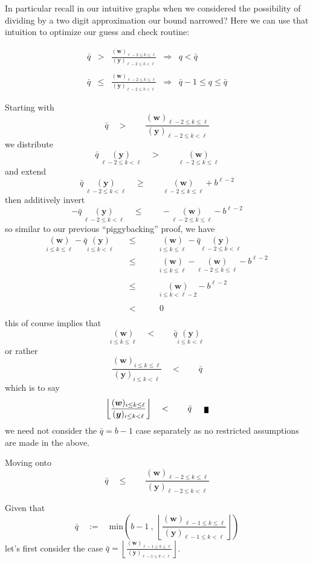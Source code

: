 \documentclass[twoside]{article}
\renewcommand{\leq}{\ensuremath{\quad\le\qquad}}
\renewcommand{\geq}{\ensuremath{\quad\ge\qquad}}
\newcommand{\bradix}[2][u]{\ensuremath{\underset{#2}{(\bm{#1})}}}
\newcommand{\numer}[3][w]{\ensuremath{(\bm{#1})_{#2\le k\le #3}}}
\newcommand{\denom}[3][y]{\ensuremath{(\bm{#1})_{#2\le k <  #3}}}
\newcommand{\qed}{\nobreak \ifvmode \relax \else
      \ifdim\lastskip<1.5em \hskip-\lastskip
      \hskip1.5em plus0em minus0.5em \fi \nobreak
      \vrule height0.5em width0.5em depth0.25em\fi}
\begin{document}
In particular recall in our intuitive graphs when we considered the possibility of dividing by a two digit approximation
our bound narrowed? Here we can use that intuition to optimize our guess and check routine:

$$ \boxed{
\begin{array}{lcccl}
\bar{q} & > & \frac{\numer{\ell-2}{\ell}}{\denom{\ell-2}{\ell}} & \Longrightarrow & q < \bar{q} \\
\\
\bar{q} & \le & \frac{\numer{\ell-2}{\ell}}{\denom{\ell-2}{\ell}} & \Longrightarrow & \bar{q}-1\le q\le\bar{q}
\end{array}
} $$

Starting with
$$ \bar{q}\quad >\qquad\frac{\numer{\ell-2}{\ell}}{\denom{\ell-2}{\ell}} $$
we distribute
$$ \bar{q}\ \bradix[y]{\ell-2\le k < \ell}\quad >\qquad\bradix[w]{\ell-2\le k\le\ell} $$
and extend
$$ \bar{q}\ \bradix[y]{\ell-2\le k < \ell}
	\geq\bradix[w]{\ell-2\le k\le\ell}+b^{\ell-2} $$
then additively invert
$$ -\bar{q}\ \bradix[y]{\ell-2\le k < \ell}
	\leq-\bradix[w]{\ell-2\le k\le\ell}-b^{\ell-2} $$
so similar to our previous ``piggybacking'' proof, we have
$$ \begin{array}{rcl}
\bradix[w]{i\le k\le\ell}-\bar{q}\bradix[y]{i\le k < \ell}
	& \leq & \bradix[w]{i\le k\le\ell}-\bar{q}\bradix[y]{\ell-2\le k < \ell}
\\
	& \leq & \bradix[w]{i\le k\le\ell}-\bradix[w]{\ell-2\le k\le\ell}-b^{\ell-2} \\
\\
	& \leq & \bradix[w]{i\le k < \ell-2}-b^{\ell-2} \\
\\
	& \quad <\qquad & 0 \\
\end{array} $$
this of course implies that
$$ \bradix[w]{i\le k\le\ell}\quad <\qquad\bar{q}\bradix[y]{i\le k < \ell} $$
or rather
$$ \frac{\numer{i}{\ell}}{\denom{i}{\ell}}
	\quad <\qquad\bar{q} $$
which is to say
$$ \left\lfloor\frac{\numer{i}{\ell}}{\denom{i}{\ell}}\right\rfloor
	\quad <\qquad\bar{q}\qed $$
we need not consider the $ \bar{q}=b-1 $ case separately as no restricted assumptions are made in the above.

\newpage

Moving onto
$$ \bar{q}\leq\frac{\numer{\ell-2}{\ell}}{\denom{\ell-2}{\ell}} $$

Given that
$$ \bar{q}\quad:=\quad\mbox{min}\left(b-1\ ,\ \left\lfloor\frac{\numer{\ell-1}{\ell}}{\denom{\ell-1}{\ell}}\right\rfloor\right) $$
let's first consider the case $ \bar{q}=\left\lfloor\frac{\numer{\ell-1}{\ell}}{\denom{\ell-1}{\ell}}\right\rfloor $.
\end{document}
